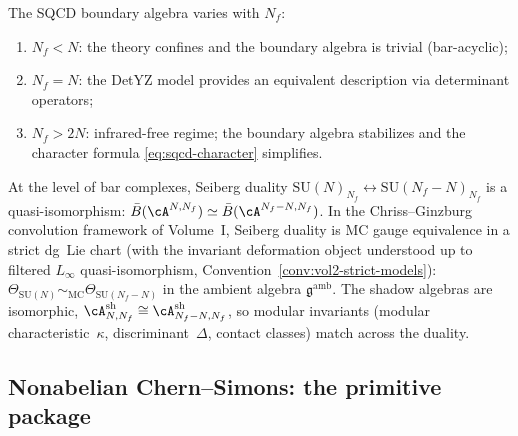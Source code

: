 \begin{remark}
\label{rem:sqcd-seiberg-duality}
The SQCD boundary algebra varies with $N_f$:
\begin{enumerate}[label=\textup{(\roman*)},nosep]
\item $N_f < N$: the theory confines and the boundary algebra is trivial (bar-acyclic);
\item $N_f = N$: the DetYZ model provides an equivalent description via determinant operators;
\item $N_f > 2N$: infrared-free regime; the boundary algebra stabilizes and the character formula \eqref{eq:sqcd-character} simplifies.
\end{enumerate}
At the level of bar complexes, Seiberg duality $\mathrm{SU}(N)_{N_f} \leftrightarrow \mathrm{SU}(N_f - N)_{N_f}$ is a quasi-isomorphism: $\bar{B}(\cA^{N,N_f}) \simeq \bar{B}(\cA^{N_f-N,N_f})$. In the Chriss--Ginzburg convolution framework of Volume~I, Seiberg duality is MC gauge equivalence in a strict dg~Lie chart \textup{(}with the invariant deformation object understood up to filtered $L_\infty$ quasi-isomorphism, Convention~\ref{conv:vol2-strict-models}\textup{)}: $\Theta_{\mathrm{SU}(N)} \sim_{\mathrm{MC}} \Theta_{\mathrm{SU}(N_f-N)}$ in the ambient algebra $\mathfrak{g}^{\mathrm{amb}}$. The shadow algebras are isomorphic, $\cA^{\mathrm{sh}}_{N,N_f} \cong \cA^{\mathrm{sh}}_{N_f-N,N_f}$, so modular invariants (modular characteristic~$\kappa$, discriminant~$\Delta$, contact classes) match across the duality.
\end{remark}


\subsection{Nonabelian Chern--Simons: the primitive package}
\label{subsec:cs-primitive-package}

